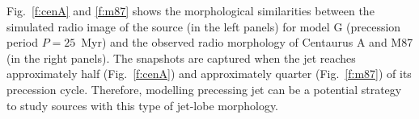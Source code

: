  Fig.~\ref{f:cenA} and \ref{f:m87} shows the morphological similarities between the simulated radio image of the source (in the left panels) for model G (precession period $P = 25$~Myr) and the observed radio morphology of Centaurus A and M87 (in the right panels). The snapshots are captured when the jet reaches approximately half (Fig.~\ref{f:cenA}) and approximately quarter (Fig.~\ref{f:m87}) of its precession cycle. Therefore, modelling precessing jet can be a potential strategy to study sources with this type of jet-lobe morphology.  













